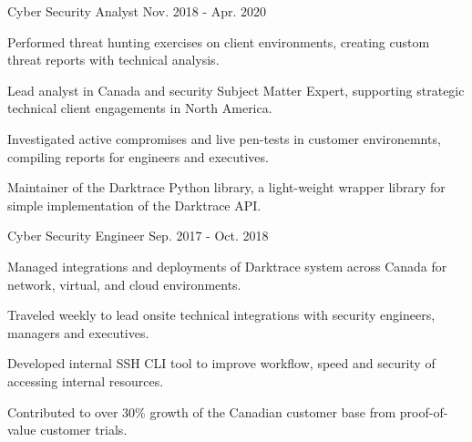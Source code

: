 \begin{cventries}
  \cventry
    {Cyber Security Analyst} %
    {} %
    {} %
    {Nov. 2018 - Apr. 2020} %
    {
      \begin{cvitems} %
        \item {Performed threat hunting exercises on client environments, creating custom threat reports with technical analysis.}
        \item {Lead analyst in Canada and security Subject Matter Expert, supporting strategic technical client engagements in North America.}
        \item {Investigated active compromises and live pen-tests in customer environemnts, compiling reports for engineers and executives.}
        \item {Maintainer of the Darktrace Python library, a light-weight wrapper library for simple implementation of the Darktrace API.}
      \end{cvitems}
    }

  \cventry
    {Cyber Security Engineer} %
    {} %
    {} %
    {Sep. 2017 - Oct. 2018} %
    {
      \begin{cvitems} %
        \item {Managed integrations and deployments of Darktrace system across Canada for network, virtual, and cloud environments.}
        \item {Traveled weekly to lead onsite technical integrations with security engineers, managers and executives.}
        \item {Developed internal SSH CLI tool to improve workflow, speed and security of accessing internal resources.}
        \item {Contributed to over 30\% growth of the Canadian customer base from proof-of-value customer trials.}
      \end{cvitems}
    }


\end{cventries}
